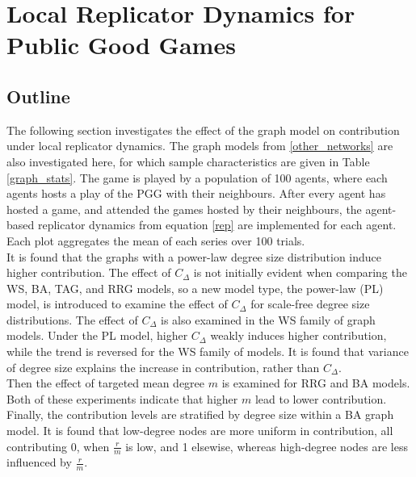 \section{Local Replicator Dynamics for Public Good Games}
\subsection{Outline}
The following section investigates the effect of the graph model on contribution under local replicator dynamics. The graph models from \ref{other_networks} are also investigated here, for which sample characteristics are given in Table \ref{graph_stats}. The game is played by a population of 100 agents, where each agents hosts a play of the PGG with their neighbours. After every agent has hosted a game, and attended the games hosted by their neighbours, the agent-based replicator dynamics from equation \eqref{rep} are implemented for each agent. Each plot aggregates the mean of each series over 100 trials. \\

It is found that the graphs with a power-law degree size distribution induce higher contribution. The effect of $C_\Delta$ is not initially evident when comparing the WS, BA, TAG, and RRG models, so a new model type, the power-law (PL) model, is introduced to examine the effect of $C_\Delta$ for scale-free degree size distributions. The effect of $C_\Delta$ is also examined in the WS family of graph models. Under the PL model, higher $C_\Delta$ weakly induces higher contribution, while the trend is reversed for the WS family of models. It is found that variance of degree size explains the increase in contribution, rather than $C_\Delta$.  \\

Then the effect of targeted mean degree $m$ is examined for RRG and BA models. Both of these experiments indicate that higher $m$ lead to lower contribution. Finally, the contribution levels are stratified by degree size within a BA graph model. It is found that low-degree nodes are more uniform in contribution, all contributing 0, when $\frac{r}{m}$ is low, and 1 elsewise, whereas high-degree nodes are less influenced by $\frac{r}{m}$. 



